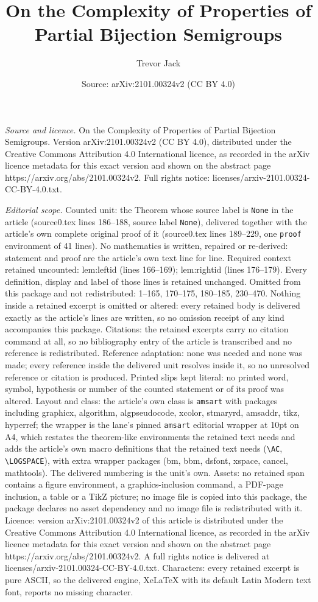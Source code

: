 \documentclass[10pt,a4paper]{amsart}
\title[On the Complexity of Properties of Partial Bijection Semigro]{On the Complexity of Properties of Partial Bijection Semigroups}
\author{Trevor Jack}
\date{Source: arXiv:2101.00324v2 (CC BY 4.0)}
\begin{document}
\maketitle

\noindent\emph{Source and licence.} On the Complexity of Properties of Partial Bijection Semigroups. Version arXiv:2101.00324v2 (CC BY 4.0), distributed under the Creative Commons Attribution 4.0 International licence, as recorded in the arXiv licence metadata for this exact version and shown on the abstract page https://arxiv.org/abs/2101.00324v2. Full rights notice: licenses/arxiv-2101.00324-CC-BY-4.0.txt.\par\smallskip

\noindent\textit{Editorial scope.} Counted unit: the Theorem whose source label is \texttt{None} in the article (source0.tex lines 186--188, source label \texttt{None}), delivered together with the article's own complete original proof of it (source0.tex lines 189--229, one \texttt{proof} environment of 41 lines). No mathematics is written, repaired or re-derived: statement and proof are the article's own text line for line. Required context retained uncounted: lem:leftid (lines 166--169); lem:rightid (lines 176--179). Every definition, display and label of those lines is retained unchanged. Omitted from this package and not redistributed: 1--165, 170--175, 180--185, 230--470. Nothing inside a retained excerpt is omitted or altered: every retained body is delivered exactly as the article's lines are written, so no omission receipt of any kind accompanies this package. Citations: the retained excerpts carry no citation command at all, so no bibliography entry of the article is transcribed and no reference is redistributed. Reference adaptation: none was needed and none was made; every reference inside the delivered unit resolves inside it, so no unresolved reference or citation is produced. Printed slips kept literal: no printed word, symbol, hypothesis or number of the counted statement or of its proof was altered. Layout and class: the article's own class is \texttt{amsart} with packages including graphicx, algorithm, algpseudocode, xcolor, stmaryrd, amsaddr, tikz, hyperref; the wrapper is the lane's pinned \texttt{amsart} editorial wrapper at 10pt on A4, which restates the theorem-like environments the retained text needs and adds the article's own macro definitions that the retained text needs (\texttt{\textbackslash AC}, \texttt{\textbackslash LOGSPACE}), with extra wrapper packages (bm, bbm, dsfont, xspace, cancel, mathtools). The delivered numbering is the unit's own. Assets: no retained span contains a figure environment, a graphics-inclusion command, a PDF-page inclusion, a table or a TikZ picture; no image file is copied into this package, the package declares no asset dependency and no image file is redistributed with it. Licence: version arXiv:2101.00324v2 of this article is distributed under the Creative Commons Attribution 4.0 International licence, as recorded in the arXiv licence metadata for this exact version and shown on the abstract page https://arxiv.org/abs/2101.00324v2. A full rights notice is delivered at licenses/arxiv-2101.00324-CC-BY-4.0.txt. Characters: every retained excerpt is pure ASCII, so the delivered engine, XeLaTeX with its default Latin Modern text font, reports no missing character.
\end{document}
